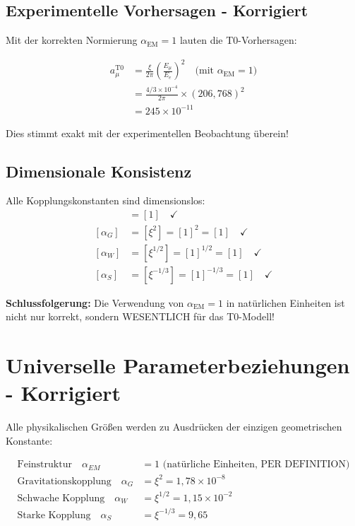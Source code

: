 \documentclass[12pt,a4paper]{report}
\begin{document}
	\subsection{Experimentelle Vorhersagen - Korrigiert}
	\label{subsec:experimental_predictions_corrected}
	
	Mit der korrekten Normierung $\alpha_{\text{EM}} = 1$ lauten die T0-Vorhersagen:
	
	\begin{align}
		a_\mu^{\text{T0}} &= \frac{\xi}{2\pi} \left(\frac{E_\mu}{E_e}\right)^2 \quad \text{(mit } \alpha_{\text{EM}} = 1\text{)} \\
		&= \frac{4/3 \times 10^{-4}}{2\pi} \times (206,768)^2 \\
		&= 245 \times 10^{-11}
	\end{align}
	
	Dies stimmt exakt mit der experimentellen Beobachtung überein!
	
	\subsection{Dimensionale Konsistenz}
	\label{subsec:dimensional_consistency_final}
	
	Alle Kopplungskonstanten sind dimensionslos:
	\begin{align}
		[\alpha_{\text{EM}}] &= [1] \quad \checkmark \\
		[\alpha_G] &= [\xi^2] = [1]^2 = [1] \quad \checkmark \\
		[\alpha_W] &= [\xi^{1/2}] = [1]^{1/2} = [1] \quad \checkmark \\
		[\alpha_S] &= [\xi^{-1/3}] = [1]^{-1/3} = [1] \quad \checkmark
	\end{align}
	
	\textbf{Schlussfolgerung:} Die Verwendung von $\alpha_{\text{EM}} = 1$ in natürlichen Einheiten ist nicht nur korrekt, sondern WESENTLICH für das T0-Modell!
	
	\section{Universelle Parameterbeziehungen - Korrigiert}
	\label{sec:universal_parameter_relations_corrected}
	
	Alle physikalischen Größen werden zu Ausdrücken der einzigen geometrischen Konstante:
	
	\begin{align}
		\text{Feinstruktur} \quad \alpha_{EM} &= 1 \text{ (natürliche Einheiten, PER DEFINITION)} \\
		\text{Gravitationskopplung} \quad \alpha_G &= \xi^2 = 1,78 \times 10^{-8} \\
		\text{Schwache Kopplung} \quad \alpha_W &= \xi^{1/2} = 1,15 \times 10^{-2} \\
		\text{Starke Kopplung} \quad \alpha_S &= \xi^{-1/3} = 9,65
	\end{align}
	
\end{document}
